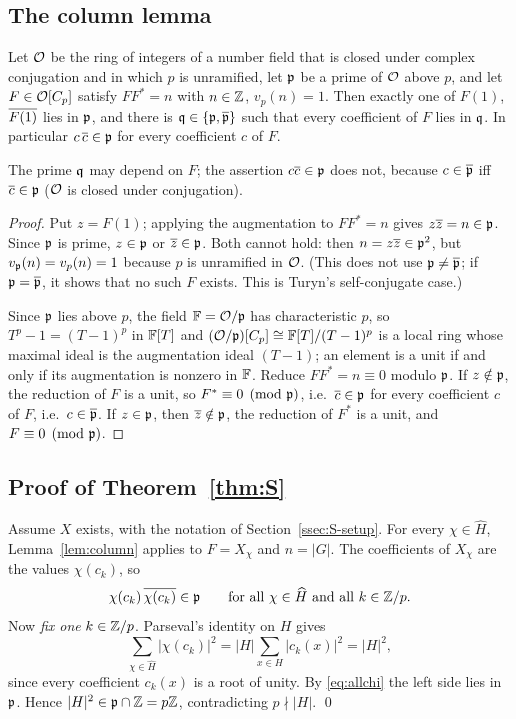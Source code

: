 \subsection{The column lemma}

\begin{lemma}\label{lem:column}
Let $\mathcal{O}$ be the ring of integers of a number field that is closed under
complex conjugation and in which $p$ is unramified, let $\mathfrak{p}$ be a prime
of $\mathcal{O}$ above $p$, and let $F\in\mathcal{O}[C_p]$ satisfy $FF^*=n$ with
$n\in\mathbb{Z}$, $v_p(n)=1$. Then exactly one of $F(1)$, $\overline{F(1)}$ lies in
$\mathfrak{p}$, and there is $\mathfrak{q}\in\{\mathfrak{p},\overline{\mathfrak{p}}\}$ such that every coefficient
of $F$ lies in $\mathfrak{q}$. In particular $c\,\overline{c}\in\mathfrak{p}$ for every
coefficient $c$ of $F$.
\end{lemma}

The prime $\mathfrak{q}$ may depend on $F$; the assertion $c\overline{c}\in\mathfrak{p}$ does
not, because $c\in\overline{\mathfrak{p}}$ iff $\overline{c}\in\mathfrak{p}$ ($\mathcal{O}$ is closed under
conjugation).

\begin{proof}
Put $z=F(1)$; applying the augmentation to $FF^*=n$ gives $z\overline{z}=n\in
\mathfrak{p}$. Since $\mathfrak{p}$ is prime, $z\in\mathfrak{p}$ or $\overline{z}\in\mathfrak{p}$. Both cannot
hold: then $n=z\overline{z}\in\mathfrak{p}^2$, but $v_{\mathfrak{p}}(n)=v_p(n)=1$ because $p$ is
unramified in $\mathcal{O}$. (This does not use $\mathfrak{p}\ne\overline{\mathfrak{p}}$; if
$\mathfrak{p}=\overline{\mathfrak{p}}$, it shows that no such $F$ exists. This is Turyn's
self-conjugate case.)

Since $\mathfrak{p}$ lies above $p$, the field $\mathbb{F}=\mathcal{O}/\mathfrak{p}$ has characteristic
$p$, so $T^p-1=(T-1)^p$ in $\mathbb{F}[T]$ and
$(\mathcal{O}/\mathfrak{p})[C_p]\cong\mathbb{F}[T]/(T-1)^p$ is a local ring whose maximal ideal is
the augmentation ideal $(T-1)$; an element is a unit if and only if its
augmentation is nonzero in $\mathbb{F}$. Reduce $FF^*=n\equiv0$ modulo $\mathfrak{p}$. If
$z\notin\mathfrak{p}$, the reduction of $F$ is a unit, so $F^*\equiv0\pmod{\mathfrak{p}}$,
i.e.\ $\overline{c}\in\mathfrak{p}$ for every coefficient $c$ of $F$, i.e.\
$c\in\overline{\mathfrak{p}}$. If $z\in\mathfrak{p}$, then $\overline{z}\notin\mathfrak{p}$, the reduction of
$F^*$ is a unit, and $F\equiv0\pmod{\mathfrak{p}}$.
\end{proof}

\subsection{Proof of Theorem~\ref{thm:S}}
Assume $X$ exists, with the notation of Section~\ref{ssec:S-setup}. For
every $\chi\in\widehat H$, Lemma~\ref{lem:column} applies to $F=X_\chi$
and $n=|G|$. The coefficients of $X_\chi$ are the values $\chi(c_k)$, so
\begin{equation}\label{eq:allchi}
 \chi(c_k)\,\overline{\chi(c_k)}\in\mathfrak{p}\qquad\text{for all }\chi\in\widehat H
 \text{ and all }k\in\mathbb{Z}/p .
\end{equation}
Now \emph{fix one} $k\in\mathbb{Z}/p$. Parseval's identity on $H$ gives
\[
 \sum_{\chi\in\widehat H}|\chi(c_k)|^2=|H|\sum_{x\in H}|c_k(x)|^2=|H|^2,
\]
since every coefficient $c_k(x)$ is a root of unity. By
\eqref{eq:allchi} the left side lies in $\mathfrak{p}$. Hence $|H|^2\in\mathfrak{p}\cap\mathbb{Z}
=p\mathbb{Z}$, contradicting $p\nmid|H|$. \qed

